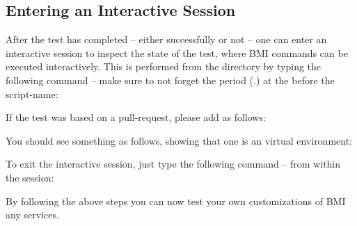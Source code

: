 \subsection{Entering an Interactive Session}

After the test has completed -- either successfully or not -- one can enter an interactive session to inspect the state of the test, where BMI commands can be executed interactively.  This is performed from the  directory by typing the following command -- make sure to not forget the period (.) at the before the script-name:

\begin{center}
\end{center}

If the test was based on a pull-request, please add  as follows:

\begin{center}
\end{center}

You should see something as follows, showing that one is an virtual environment:

\begin{center}
\end{center}

To exit the interactive session, just type the following command -- from within the session:

\begin{center}
\end{center}

By following the above steps you can now test your own customizations of BMI any services.
